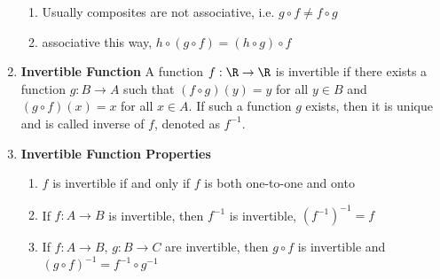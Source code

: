 \documentclass[11pt]{article}
\begin{document}
\begin{defn*}
\begin{enumerate}
        \begin{enumerate}
            \item Usually composites are not associative, i.e. $g\circ f \neq f \circ g$
            \item associative this way, $h\circ (g \circ f) = (h\circ g) \circ f$
        \end{enumerate}
        \item \textbf{Invertible Function} A function $f: \R \to \R$ is invertible if there exists a function $g: B\to A$ such that $(f\circ g)(y) = y$ for all $y\in B$ and $(g\circ f)(x) = x$ for all $x\in A$. If such a function $g$ exists, then it is unique and is called inverse of $f$, denoted as $f^{-1}$. 
        \item \textbf{Invertible Function Properties}
        \begin{enumerate}
            \item $f$ is invertible if and only if $f$ is both one-to-one and onto
            \item If $f: A\to B$ is invertible, then $f^{-1}$ is invertible, $(f^{-1})^{-1} = f$
            \item If $f: A\to B$, $g: B\to C$ are invertible, then $g\circ f$ is invertible and $(g\circ f)^{-1} = f^{-1} \circ g^{-1}$
        \end{enumerate}
    \end{enumerate}
\end{defn*}


\end{document}
